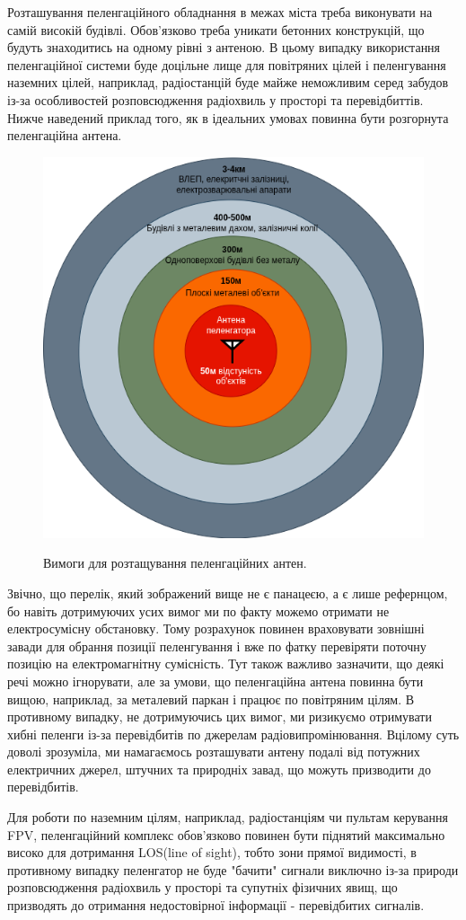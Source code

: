 \documentclass{article}
\begin{document}
Розташування пеленгаційного обладнання в межах міста треба виконувати на самій високій будівлі. Обов'язково треба уникати бетонних конструкцій, що будуть знаходитись на одному рівні з антеною. В цьому випадку використання пеленгаційної системи буде доцільне лище для повітряних цілей і пеленгування наземних цілей, наприклад, радіостанцій буде майже неможливим серед забудов із-за особливостей розповсюдження радіохвиль у просторі та перевідбиттів. Нижче наведений приклад того, як в ідеальних умовах повинна бути розгорнута пеленгаційна антена.

\begin{figure}[H]
	\centering
	{\includegraphics[width=0.5\linewidth]{images/obstacles_for_df_antenna.png}}
	\caption{\label{fig:triangulations} Вимоги для розтащування пеленгаційних антен.}
\end{figure}

Звічно, що перелік, який зображений вище не є панацеєю, а є лише рефернцом, бо навіть дотримуючих усих вимог ми по факту можемо отримати не електросумісну обстановку. Тому розрахунок повинен враховувати зовнішні завади для обрання позиції пеленгування і вже по фатку перевіряти поточну позицію на електромагнітну сумісність. Тут також важливо зазначити, що деякі речі можно ігнорувати, але за умови, що пеленгаційна антена повинна бути вищою, наприклад, за металевий паркан і працює по повітряним цілям. В противному випадку, не дотримуючись цих вимог, ми ризикуємо отримувати хибні пеленги із-за перевідбитів по джерелам радіовипромінювання. Вцілому суть доволі зрозуміла, ми намагаємось розташувати антену подалі від потужних електричних джерел, штучних та природніх завад, що можуть призводити до перевідбитів. 

Для роботи по наземним цілям, наприклад, радіостанціям чи пультам керування FPV, пеленгаційний комплекс обов'язково повинен бути піднятий максимально високо для дотримання LOS(line of sight), тобто зони прямої видимості, в противному випадку пеленгатор не буде "бачити" сигнали виключно із-за природи розповсюдження радіохвиль у просторі та супутніх фізичних явищ, що призводять до отримання недостовірної інформації - перевідбитих сигналів.
\end{document}
